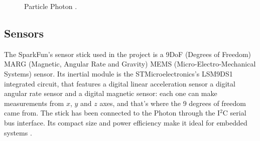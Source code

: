 \begin{center}
	\begin{figure}[ht]
		\caption{Particle Photon \cite{Photon}.}
	\end{figure}
\end{center}

\subsection{Sensors}
The SparkFun's sensor stick used in the project is a 9DoF (Degrees of Freedom) MARG (Magnetic, Angular Rate and Gravity) MEMS (Micro-Electro-Mechanical Systems) sensor. Its inertial module is the STMicroelectronics's LSM9DS1 integrated circuit, that features a digital linear acceleration sensor a digital angular rate sensor and a digital magnetic sensor: each one can make measurements from $x$, $y$ and $z$ axes, and that's where the 9 degrees of freedom came from. The stick has been connected to the Photon through the I$^2$C serial bus interface. Its compact size and power efficiency make it ideal for embedded systems \cite{SensorDatasheet}.

